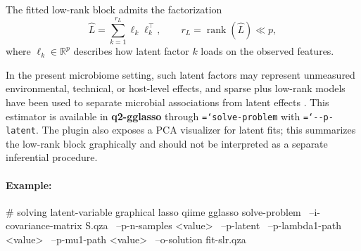 \documentclass[11pt,a4paper]{article}
\newcommand{\code}[1]{\allowbreak\texttt{\hyphenchar\font=`\-\relax #1}}
\newcommand{\pkg}[1]{\textbf{#1}}
\newcommand{\R}{\mathbb{R}}
\DeclareMathOperator{\rank}{rank}
\begin{document}
The fitted low-rank block admits the factorization
\begin{equation}
\label{eq:lfactor}
\widehat L = \sum_{k=1}^{r_L} \ell_k \ell_k^{\top},
\qquad r_L = \rank(\widehat L) \ll p ,
\end{equation}
where $\ell_k \in \R^p$ describes how latent factor $k$ loads on the observed
features.

In the present microbiome setting, such latent factors may represent unmeasured
environmental, technical, or host-level effects, and sparse plus low-rank models
have been used to separate microbial associations from latent effects
\citep{kurtz2019disentangling}. This estimator is available in
\pkg{q2-gglasso} through \code{solve-problem} with \code{-{}-p-latent}. The
plugin also exposes a PCA visualizer for latent fits; this summarizes the
low-rank block graphically and should not be interpreted as a separate inferential
procedure.

\paragraph{Example:} \mbox{}
\begin{PseudoCode}
# solving latent-variable graphical lasso
qiime gglasso solve-problem \
    --i-covariance-matrix S.qza \
    --p-n-samples <value> \
    --p-latent \
    --p-lambda1-path <value> \
    --p-mu1-path <value> \
    --o-solution fit-slr.qza
\end{PseudoCode}
\end{document}
